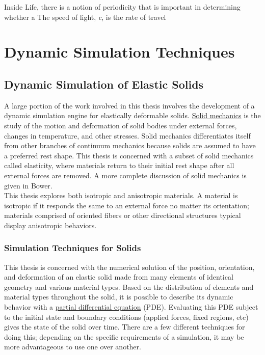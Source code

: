 {Inside Life, there is a notion of periodicity that is important in determining whether a 
The speed of light, \textit{c}, is the rate of travel 

\section{Dynamic Simulation Techniques}

\subsection{Dynamic Simulation of Elastic Solids}

A large portion of the work involved in this thesis involves the development of a dynamic simulation engine for elastically deformable solids.  \href{https://en.wikipedia.org/wiki/Solid_mechanics}{Solid mechanics} is the study of the motion and deformation of solid bodies under external forces, changes in temperature, and other stresses.  Solid mechanics differentiates itself from other branches of continuum mechanics because solids are assumed to have a preferred rest shape.  This thesis is concerned with a subset of solid mechanics called elasticity, where materials return to their initial rest shape after all external forces are removed.  A more complete discussion of solid mechanics is given in Bower\cite{Bower2009}.\\  

This thesis explores both isotropic and anisotropic materials.  A material is isotropic if it responds the same to an external force no matter its orientation; materials comprised of oriented fibers or other directional structures typical display anisotropic behaviors.  

\subsubsection{Simulation Techniques for Solids}

This thesis is concerned with the numerical solution of the position, orientation, and deformation of an elastic solid made from many elements of identical geometry and various material types.  Based on the distribution of elements and material types throughout the solid, it is possible to describe its dynamic behavior with a \href{https://en.wikipedia.org/wiki/Partial_differential_equation}{partial differential equation} (PDE).  Evaluating this PDE subject to the initial state and boundary conditions (applied forces, fixed regions, etc) gives the state of the solid over time.  There are a few different techniques for doing this; depending on the specific requirements of a simulation, it may be more advantageous to use one over another.\\

}
